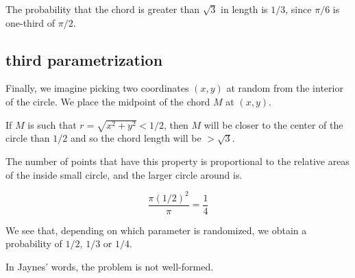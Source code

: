 \documentclass[11pt, oneside]{article}
\begin{document}
The probability that the chord is greater than $\sqrt{3}$ in length is $1/3$, since $\pi/6$ is one-third of $\pi/2$.

\subsection*{third parametrization}

Finally, we imagine picking two coordinates $(x,y)$ at random from the interior of the circle.  We place the midpoint of the chord $M$ at $(x,y)$.

If $M$ is such that $r = \sqrt{x^2 + y^2} < 1/2$, then $M$ will be closer to the center of the circle than $1/2$ and so the chord length will be $> \sqrt{3}$.

The number of points that have this property is proportional to the relative areas of the inside small circle, and the larger circle around is.

\[ \frac{\pi (1/2)^2}{\pi} = \frac{1}{4} \]

We see that, depending on which parameter is randomized, we obtain a probability of $1/2$, $1/3$ or $1/4$.

In Jaynes' words, the problem is not well-formed.
\end{document}
